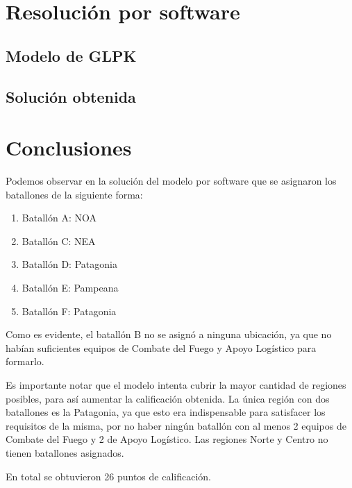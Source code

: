 \documentclass[12pt]{article}
\begin{document}
\section{Resolución por software}

\subsection{Modelo de GLPK}



\subsection{Solución obtenida}



\section{Conclusiones}

Podemos observar en la solución del modelo por software que se asignaron los batallones de la siguiente forma:

\begin{enumerate}
	\item Batallón A: NOA
	\item Batallón C: NEA
	\item Batallón D: Patagonia
	\item Batallón E: Pampeana
	\item Batallón F: Patagonia
\end{enumerate}

Como es evidente, el batallón B no se asignó a ninguna ubicación, ya que no habían suficientes equipos de Combate del Fuego y Apoyo Logístico para formarlo.

Es importante notar que el modelo intenta cubrir la mayor cantidad de regiones posibles, para así aumentar la calificación obtenida. La única región con dos batallones es la Patagonia, ya que esto era indispensable para satisfacer los requisitos de la misma, por no haber ningún batallón con al menos 2 equipos de Combate del Fuego y 2 de Apoyo Logístico. Las regiones Norte y Centro no tienen batallones asignados.

En total se obtuvieron 26 puntos de calificación.
\end{document}
